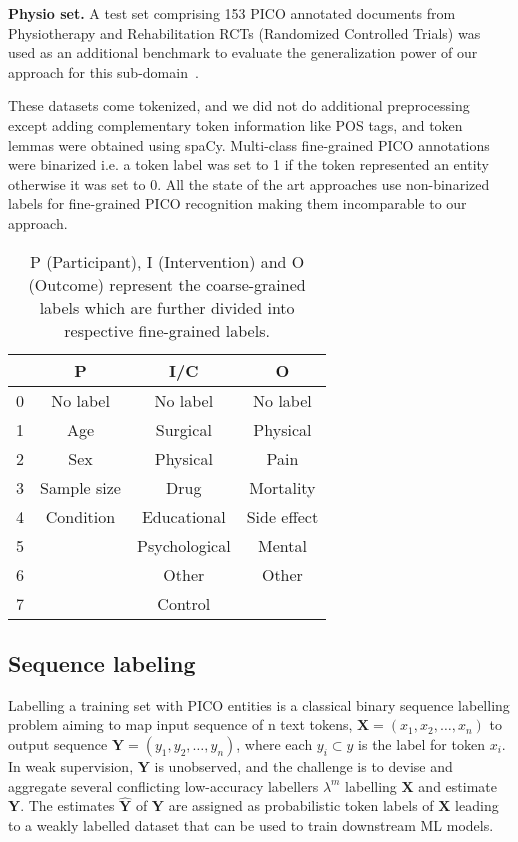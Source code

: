 \documentclass[10.7pt,]{article}
\begin{document}
\textbf{Physio set.} A test set comprising 153 PICO annotated documents from Physiotherapy and Rehabilitation RCTs (Randomized Controlled Trials) was used as an additional benchmark to evaluate the generalization power of our approach for this sub-domain~\cite{dhrangadhariya2021end}.

These datasets come tokenized, and we did not do additional preprocessing except adding complementary token information like POS tags, and token lemmas were obtained using spaCy.
Multi-class fine-grained PICO annotations were binarized i.e. a token label was set to 1 if the token represented an entity otherwise it was set to 0.
All the state of the art approaches use non-binarized labels for fine-grained PICO recognition making them incomparable to our approach.
%
%
%
\begin{table}[h!]
\begin{center}
\begin{tabular}{| c | c | c | c |} 
\hline
 & P & I/C & O \\ 
\hline
0 & No label & No label & No label \\ 
1 & Age & Surgical & Physical \\ 
2 & Sex & Physical & Pain \\
3 & Sample size & Drug & Mortality \\
4 & Condition & Educational & Side effect \\
5 &  & Psychological & Mental \\
6 &  & Other & Other \\
7 &  & Control &  \\
\hline
\end{tabular}
\caption{\label{table:coarsefineconcept} P (Participant), I (Intervention) and O (Outcome) represent the coarse-grained labels which are further divided into respective fine-grained labels.}
\end{center}
\end{table}
%
%
%
\subsection{Sequence labeling}\label{seq_lab}
%
Labelling a training set with PICO entities is a classical binary sequence labelling problem aiming to map input sequence of n text tokens, $ \bm{X} = (x_{1}, x_{2}, \dotso , x_{n} )$ to output sequence $\bm{Y} = (y_{1}, y_{2}, \dotso , y_{n} )$, where each $y_{i} \subset y$ is the label for token $x_{i}$.
In weak supervision, $\bm{Y}$ is unobserved, and the challenge is to devise and aggregate several conflicting low-accuracy labellers $\lambda^{m}$ labelling $\bm{X}$ and estimate $\bm{Y}$.
The estimates $\bm{\hat{Y}}$ of $\bm{Y}$ are assigned as probabilistic token labels of $\bm{X}$ leading to a weakly labelled dataset that can be used to train downstream ML models.
\end{document}
